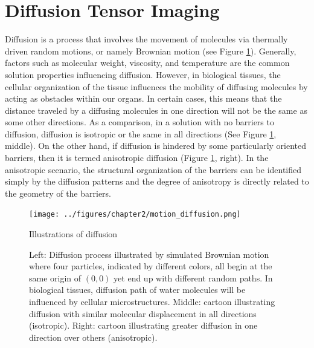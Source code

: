 \section{Diffusion Tensor Imaging}
Diffusion is a process that involves the movement of molecules via thermally driven random motions, or namely Brownian motion (see Figure \ref{fig:diffusion}). Generally, factors such as molecular weight, viscosity, and temperature are the common solution properties influencing diffusion. However, in biological tissues, the cellular organization of the tissue influences the mobility of diffusing molecules by acting as obstacles within our organs. In certain cases, this means that the distance traveled by a diffusing molecules in one direction will not be the same as some other directions. As a comparison, in a solution with no barriers to diffusion, diffusion is isotropic or the same in all directions (See Figure \ref{fig:diffusion}, middle). On the other hand, if diffusion is hindered by some particularly oriented barriers, then it is termed anisotropic diffusion (Figure \ref{fig:diffusion}, right). In the anisotropic scenario, the structural organization of the barriers can be identified simply by the diffusion patterns and the degree of anisotropy is directly related to the geometry of the barriers. 

\begin{figure}[htbp]
	\centering
	\texttt{[image: ../figures/chapter2/motion\_diffusion.png]}
	\caption{Illustrations of diffusion}
	\caption*{Left: Diffusion process illustrated by simulated Brownian motion where four particles, indicated by different colors, all begin at the same origin of $(0,0)$ yet end up with different random paths. In biological tissues, diffusion path of water molecules will be influenced by cellular microstructures. Middle: cartoon illustrating diffusion with similar molecular displacement in all directions (isotropic). Right: cartoon illustrating greater diffusion in one direction over others (anisotropic).}
	\label{fig:diffusion}
\end{figure}

